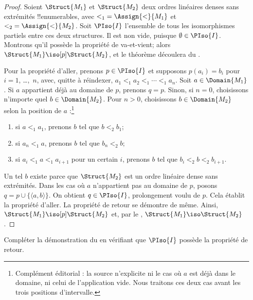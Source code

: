 \documentclass[../../../include/open-logic-section]{subfiles}
\begin{document}
\begin{proof}
  Soient $\Struct{M_1}$ et $\Struct{M_2}$ deux ordres linéaires
  denses sans extrémités !!{enumerable}s, avec
  ${<_1} = \Assign{<}{M_1}$ et ${<_2} = \Assign{<}{M_2}$.
  Soit $\PIso{I}$ l'ensemble de tous les isomorphismes
  partiels entre ces deux structures. Il est non vide,
  puisque $\emptyset \in \PIso{I}$. Montrons qu'il
  possède la propriété de va-et-vient; alors
  $\Struct{M_1} \iso[p] \Struct{M_2}$, et le théorème
  découlera du .

  Pour la propriété d'aller, prenons $p \in \PIso{I}$
  et supposons $p(a_i) = b_i$ pour $i = 1$, \dots,~$n$,
  avec, quitte à réindexer,
  $a_1 <_1 a_2 <_1 \cdots <_1 a_n$.
  Soit $a \in \Domain{M_1}$. Si $a$ appartient déjà
  au domaine de $p$, prenons $q=p$. Sinon, si
  $n=0$, choisissons n'importe quel
  $b\in\Domain{M_2}$. Pour $n>0$, choisissons
  $b \in \Domain{M_2}$ selon la position de $a$ :\footnote{Complément éditorial : la source n'explicite ni le cas où $a$ est déjà dans le domaine, ni celui de l'application vide. Nous traitons ces deux cas avant les trois positions d'intervalle.}
  \begin{enumerate}
  \item si $a <_1 a_1$, prenons $b$ tel que $b <_2 b_1$;
  \item si $a_n <_1 a$, prenons $b$ tel que $b_n <_2 b$;
  \item si $a_i <_1 a <_1 a_{i+1}$ pour un certain $i$,
    prenons $b$ tel que $b_i <_2 b <_2 b_{i+1}$.
  \end{enumerate}
  Un tel $b$ existe parce que $\Struct{M_2}$ est un
  ordre linéaire dense sans extrémités. Dans les cas
  où $a$ n'appartient pas au domaine de $p$, posons
  $q = p \cup \{ \langle a, b \rangle \}$.
  On obtient $q \in \PIso{I}$, prolongement voulu de
  $p$. Cela établit la propriété d'aller. La propriété
  de retour se démontre de même. Ainsi,
  $\Struct{M_1} \iso[p] \Struct{M_2}$ et, par le
  , $\Struct{M_1} \iso
  \Struct{M_2}$.
\end{proof}

\begin{prob}
  Compléter la démonstration du
  en vérifiant que $\PIso{I}$ possède la propriété de retour.
\end{prob}
\end{document}
